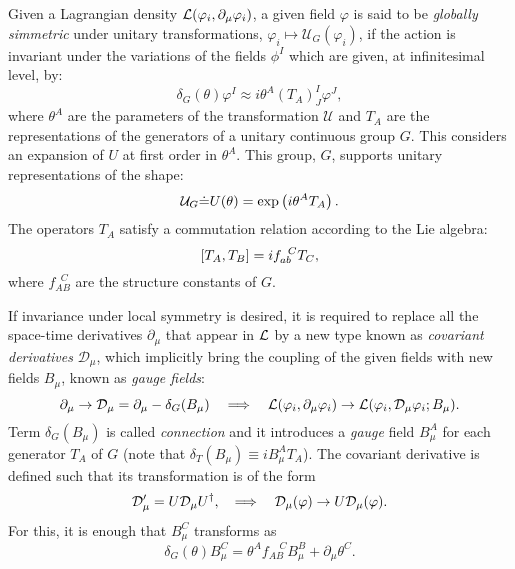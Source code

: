Given a Lagrangian density $\mathcal{L}(\varphi_i,\partial_\mu \varphi_i)$, a given field $\varphi$ is said to be \textit{globally simmetric} under unitary transformations, $\varphi_i\mapsto \mathcal{U}_G(\varphi_i)$, if the action is invariant under the variations of the fields $\phi^{I}$ which are given, at infinitesimal level, by:
\begin{equation}
	\delta_G(\theta) \varphi^I\approx i\theta^A(T_A)_{J}^I\varphi^J,
\end{equation}
where $\theta^{A}$ are the parameters of the transformation $\mathcal{U}$ and $T_{A}$ are the representations of the generators of a unitary continuous group $G$. This considers an expansion of $U$ at first order in $\theta^{A}$. This group, $G$, supports unitary representations of the shape:
\begin{equation}
	\mathcal{U}_G\dot=U(\theta)=\exp\fac{i\theta^A T_A}.
\end{equation}
The operators $T_A$ satisfy a commutation relation according to the Lie algebra:
\begin{equation}
	\cor{ T_A,T_B }= if_{ab}^{\;\;C}T_C,
\end{equation}
where $f_{AB}^{\;\;C}$ are the structure constants of $G$.

If invariance under local symmetry is desired, it is required to replace all the space-time derivatives $\partial_\mu$ that appear in $\mathcal{L}$ by a new type known as \textit{covariant derivatives} $\mathcal{D}_\mu$, which implicitly bring the coupling of the given fields with new fields $B_\mu$, known as \textit{gauge fields}:
\begin{equation}
	\partial_\mu\rightarrow \mathcal{D}_\mu=\partial_\mu-
	\delta_G(B_\mu)\quad
	\Longrightarrow
	\quad\mathcal{L}(\varphi_i,\partial_\mu\varphi_i)\rightarrow 
	\mathcal{L}(\varphi_i,\mathcal{D}_\mu
	\varphi_i;B_\mu).  
\end{equation}
Term $\delta_G(B_\mu)$ is called \textit{connection} and it introduces a \textit{gauge} field $B_\mu^A$ for each generator $T_A$ of $G$ (note that 
$\delta_T(B_\mu)\equiv iB_\mu^AT_A$).
The covariant derivative is defined such that its transformation is of the form
\begin{equation}
	\mathcal{D}'_\mu=U\mathcal{D}_\mu U^\dagger,
	\;\;\;\,\Longrightarrow\;\;\;\, \mathcal{D}_\mu (\varphi) \rightarrow U \mathcal{D}_\mu (\varphi).
\end{equation} 
For this, it is enough that ${B}_\mu^C$ transforms as
\begin{equation}
	\delta_G(\theta){B}_\mu^C=\theta^Af_{AB}^{\;\;\;\;C} B^B_\mu
	+\partial_\mu \theta^C.\label{eq2}
\end{equation}

